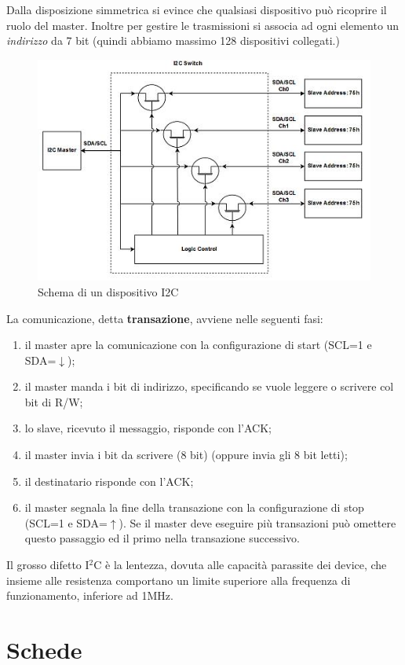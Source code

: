 \documentclass[
]{book}
\providecommand{\tightlist}{%
  \setlength{\itemsep}{0pt}\setlength{\parskip}{0pt}}
\begin{document}
Dalla disposizione simmetrica si evince che qualsiasi dispositivo può
ricoprire il ruolo del master. Inoltre per gestire le trasmissioni si
associa ad ogni elemento un \emph{indirizzo} da 7 bit (quindi abbiamo
massimo 128 dispositivi collegati.)

\begin{figure}
\centering
\includegraphics[width=0.5\linewidth,height=\textheight,keepaspectratio]{assets/imgs/i2c_device.jpg}
\caption{Schema di un dispositivo I2C}
\end{figure}

La comunicazione, detta \textbf{transazione}, avviene nelle seguenti
fasi:

\begin{enumerate}
\def\labelenumi{\arabic{enumi})}
\tightlist
\item
  il master apre la comunicazione con la configurazione di start (SCL=1
  e SDA=\(\downarrow\));
\item
  il master manda i bit di indirizzo, specificando se vuole leggere o
  scrivere col bit di R/W;
\item
  lo slave, ricevuto il messaggio, risponde con l'ACK;
\item
  il master invia i bit da scrivere (8 bit) (oppure invia gli 8 bit
  letti);
\item
  il destinatario risponde con l'ACK;
\item
  il master segnala la fine della transazione con la configurazione di
  stop (SCL=1 e SDA=\(\uparrow\)). Se il master deve eseguire più
  transazioni può omettere questo passaggio ed il primo nella
  transazione successivo.
\end{enumerate}

Il grosso difetto I\(^2\)C è la lentezza, dovuta alle capacità parassite
dei device, che insieme alle resistenza comportano un limite superiore
alla frequenza di funzionamento, inferiore ad 1MHz.

\section{Schede}\label{schede}
\end{document}
